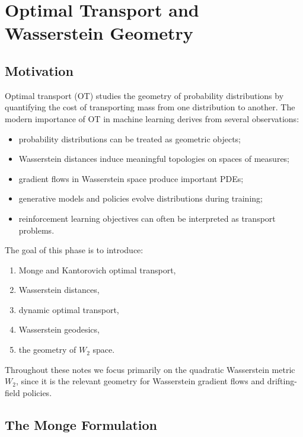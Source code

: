 
\chapter{Optimal Transport and Wasserstein Geometry}
\section{Motivation}
Optimal transport (OT) studies the geometry of probability distributions by quantifying the cost of transporting mass from one distribution to another.
The modern importance of OT in machine learning derives from several observations:
\begin{itemize}
    \item probability distributions can be treated as geometric objects;
    \item Wasserstein distances induce meaningful topologies on spaces of measures;
    \item gradient flows in Wasserstein space produce important PDEs;
    \item generative models and policies evolve distributions during training;
    \item reinforcement learning objectives can often be interpreted as transport problems.
\end{itemize}
The goal of this phase is to introduce:
\begin{enumerate}[label=(\roman*)]
    \item Monge and Kantorovich optimal transport,
    \item Wasserstein distances,
    \item dynamic optimal transport,
    \item Wasserstein geodesics,
    \item the geometry of $W_2$ space.
\end{enumerate}
Throughout these notes we focus primarily on the quadratic Wasserstein metric $W_2$, since it is the relevant geometry for Wasserstein gradient flows and drifting-field policies.
\section{The Monge Formulation}

